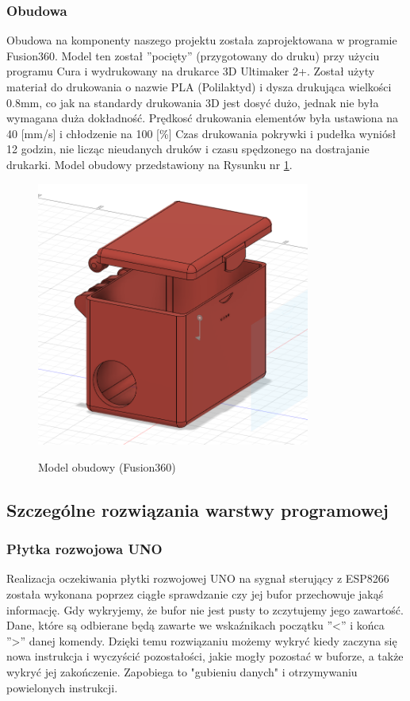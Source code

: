 \documentclass[12pt]{article}
\begin{document}
\newpage
\subsubsection{Obudowa}
Obudowa na komponenty naszego projektu została zaprojektowana w programie Fusion360. Model ten został ''pocięty'' (przygotowany do druku) przy użyciu programu Cura i wydrukowany na drukarce 3D Ultimaker 2+. Został użyty materiał do drukowania o nazwie PLA (Polilaktyd) i dysza drukująca wielkości 0.8mm, co jak na standardy drukowania 3D jest dosyć dużo, jednak nie była wymagana duża dokładność. Prędkosć drukowania elementów była ustawiona na 40 [mm/s] i chłodzenie na 100 [\%]
Czas drukowania pokrywki i pudełka wyniósł 12 godzin, nie licząc nieudanych druków i czasu spędzonego na dostrajanie drukarki.
Model obudowy przedstawiony na Rysunku nr \ref{fig:modelobudowy}.
\begin{figure}[!h]
	\begin{center}
		{\includegraphics[width=9cm]{obudowa_model.png}}
	\end{center}
	\caption{Model obudowy (Fusion360)}
	\label{fig:modelobudowy}
\end{figure}

\newpage
\subsection{Szczególne rozwiązania warstwy programowej}
\subsubsection{Płytka rozwojowa UNO}
Realizacja oczekiwania płytki rozwojowej UNO na sygnał sterujący z ESP8266 została wykonana poprzez ciągłe sprawdzanie czy jej bufor przechowuje jakąś informację. Gdy wykryjemy, że bufor nie jest pusty to zczytujemy jego zawartość. Dane, które są odbierane będą zawarte we wskaźnikach początku ''<'' i końca ''>'' danej komendy. Dzięki temu rozwiązaniu możemy wykryć kiedy zaczyna się nowa instrukcja i wyczyścić pozostałości, jakie mogły pozostać w buforze, a także wykryć jej zakończenie. Zapobiega to "gubieniu danych" i otrzymywaniu powielonych instrukcji.
\end{document}
